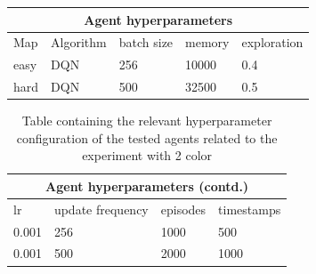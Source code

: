 \documentclass{article}
\begin{document}
\begin{table}[h]
    \centering
    \begin{tabular}{|p{1cm}|p{2cm}|p{1cm}|p{1.2cm}|p{1.7cm}||}
    \hline
    \multicolumn{5}{|c|}{Agent hyperparameters} \\
    \hline
    Map & Algorithm & batch size & memory & exploration \\
    \hline
    easy & DQN & 256 & 10000 & 0.4 \\
    \hline
    hard & DQN & 500 & 32500 & 0.5 \\
    \hline
    \end{tabular}
\end{table}

\begin{table}[h!]
\centering
\begin{tabular}{||p{0.8cm}|p{1cm}|p{1.2cm}|p{1.7cm}|}
 \hline
 \multicolumn{4}{|c|}{Agent hyperparameters (contd.)} \\
 \hline
lr & update frequency & episodes & timestamps\\
 \hline
 0.001 & 256 & 1000 & 500 \\
  \hline
  0.001 & 500 & 2000 & 1000 \\
\hline
\end{tabular}
\caption{Table containing the relevant hyperparameter configuration of the tested agents related to the experiment with 2 color}\label{tab:t2}
\end{table}
\end{document}
